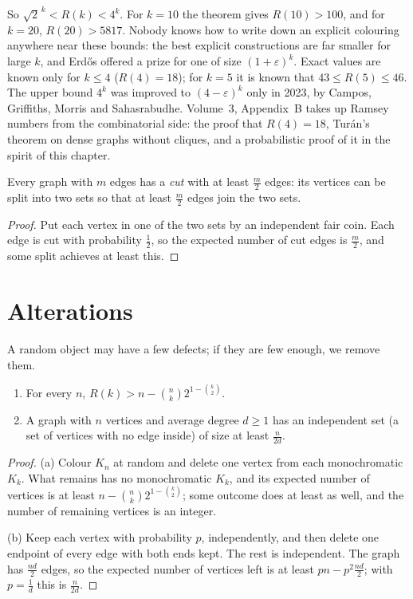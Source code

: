 So $\sqrt2^{\,k}<R(k)<4^k$. For $k=10$ the theorem gives $R(10)>100$, and for $k=20$, $R(20)>5817$. Nobody knows how to write down an explicit colouring
anywhere near these bounds: the best explicit constructions are far smaller for large $k$, and Erd\H os offered a prize for one of
size $(1+\varepsilon)^k$. Exact values are known only for $k\le4$ ($R(4)=18$); for $k=5$ it is known that $43\le R(5)\le46$. The upper bound $4^k$ was improved to
$(4-\varepsilon)^k$ only in 2023, by Campos, Griffiths, Morris and Sahasrabudhe. Volume~3, Appendix~B takes up Ramsey numbers from the combinatorial side:
the proof that $R(4)=18$, Tur\'an's theorem on dense graphs without cliques, and a probabilistic proof of it in the spirit of this chapter.

\begin{proposition}\label{prop:maxcut}
Every graph with $m$ edges has a \emph{cut} with at least $\frac m2$ edges: its vertices can be split into two sets so that at least $\frac m2$
edges join the two sets.
\end{proposition}
\begin{proof}
Put each vertex in one of the two sets by an independent fair coin. Each edge is cut with probability $\frac12$, so the expected
number of cut edges is $\frac m2$, and some split achieves at least this.
\end{proof}

\section{Alterations}

A random object may have a few defects; if they are few enough, we remove them.

\begin{proposition}\label{prop:alteration}
\begin{enumerate}[label=(\alph*)]
\item For every $n$, $R(k)>n-\binom nk2^{1-\binom k2}$.
\item A graph with $n$ vertices and average degree $d\ge1$ has an independent set (a set of vertices with no edge inside) of size at
least $\frac n{2d}$.
\end{enumerate}
\end{proposition}
\begin{proof}
(a) Colour $K_n$ at random and delete one vertex from each monochromatic $K_k$. What remains has no monochromatic $K_k$, and its expected
number of vertices is at least $n-\binom nk2^{1-\binom k2}$; some outcome does at least as well, and the number of remaining vertices is an integer.

(b) Keep each vertex with probability $p$, independently, and then delete one endpoint of every edge with both ends kept. The rest is
independent. The graph has $\frac{nd}2$ edges, so the expected number of vertices left is at least $pn-p^2\frac{nd}2$; with $p=\frac1d$ this is $\frac n{2d}$.
\end{proof}

